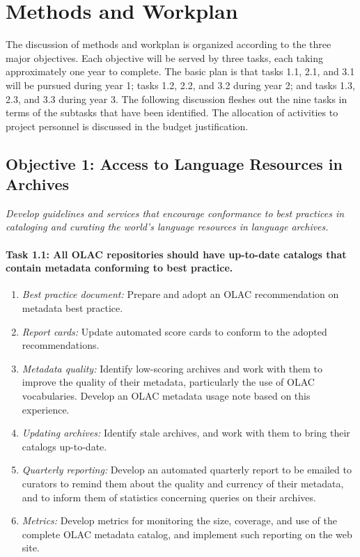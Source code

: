 \section{Methods and Workplan}

The discussion of methods and workplan is organized according to
the three major objectives.  Each objective will be served by
three tasks, each taking approximately one year to complete.
The basic plan is that tasks 1.1, 2.1, and 3.1 will be pursued
during year 1; tasks 1.2, 2.2, and 3.2 during year 2; and tasks 1.3, 2.3, and 3.3 during year 3.
The following discussion fleshes out the nine tasks in terms of the
subtasks that have been identified. The allocation of activities to project
personnel is discussed in the budget justification.


\subsection*{Objective 1: Access to Language Resources in Archives}

\emph{Develop guidelines and services that encourage conformance to best
practices in cataloging and curating the world's language resources
in language archives.}

\def\task{1.1}
\paragraph{Task {\task}: All OLAC repositories should have up-to-date catalogs
      that contain metadata conforming to best practice.}

\begin{enumerate}[label=\emph{\task\alph*}]
\item \emph{Best practice document:}
  Prepare and adopt an OLAC recommendation on metadata best practice.
\item \emph{Report cards:}
  Update automated score cards to conform to the adopted recommendations.
\item \emph{Metadata quality:}
  Identify low-scoring archives and work with them to
  improve the quality of their metadata, particularly the
  use of OLAC vocabularies. 
  Develop an OLAC metadata usage note based on this experience.
\item \emph{Updating archives:}
  Identify stale archives, and work with them to bring their 
  catalogs up-to-date.
\item \emph{Quarterly reporting:}
  Develop an automated quarterly report to be emailed to curators to 
  remind them about the quality and currency of their metadata, and to
  inform them of statistics concerning queries on their archives.
\item \emph{Metrics:}
  Develop metrics for monitoring the size, coverage, and use of the 
  complete OLAC metadata catalog, and implement such reporting on the web site.

\end{enumerate}

